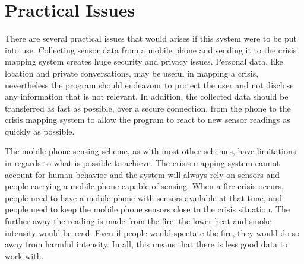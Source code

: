 \section {Practical Issues}
There are several practical issues that would arises if this system were to be put into use. Collecting sensor data from a mobile phone and sending it to the crisis mapping system creates huge security and privacy issues. Personal data, like location and private conversations, may be useful in mapping a crisis, nevertheless the program should endeavour to protect the user and not disclose any information that is not relevant. In addition, the collected data should be transferred as fast as possible, over a secure connection, from the phone to the crisis mapping system to allow the program to react to new sensor readings as quickly as possible.

The mobile phone sensing scheme, as with most other schemes, have limitations in regards to what is possible to achieve. The crisis mapping system cannot account for human behavior and the system will always rely on sensors and people carrying a mobile phone capable of sensing. When a fire crisis occurs, people need to have a mobile phone with sensors available at that time, and people need to keep the mobile phone sensors close to the crisis situation. The further away the reading is made from the fire, the lower heat and smoke intensity would be read. Even if people would spectate the fire, they would do so away from harmful intensity. In all, this means that there is less good data to work with.